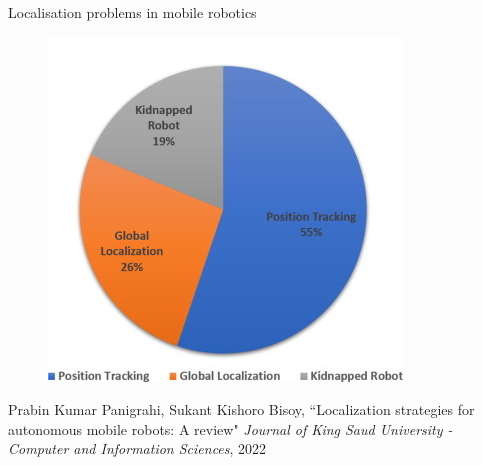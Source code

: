 \begin{frame}[noframenumbering]{Localisation problems in mobile robotics}

\begin{figure}[t!]
  \centering
  \includegraphics[scale=0.75]{./figures/03/pie.jpg}
\end{figure}


  \placebottom \vspace{-1.0cm} \tiny Prabin Kumar Panigrahi, Sukant Kishoro Bisoy, ``Localization strategies for autonomous mobile robots: A review" \textit{Journal of King Saud University - Computer and Information Sciences}, 2022

\end{frame}
